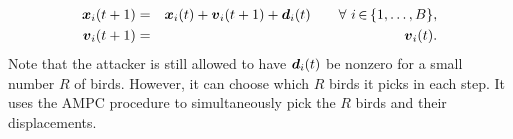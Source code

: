 \vspace*{-1mm}\begin{eqnarray}
 \xv_i(t + 1) &=& \xv_i(t) + \vv_i(t+1) + \vd_i(t) \qquad \forall~i\,{\in}\,\{1,\ldots,B\}, \nonumber \\
 \vv_i(t + 1) &=& \vv_i(t). \label{eq:attack} %
\end{eqnarray}
Note that the attacker is still allowed to have ${\boldsymbol {d}}_i(t)$ be nonzero for a small number $R$ of birds. However, it can choose which $R$ birds it picks in each step.  It uses the AMPC procedure to simultaneously pick the $R$ birds and their displacements.

%

